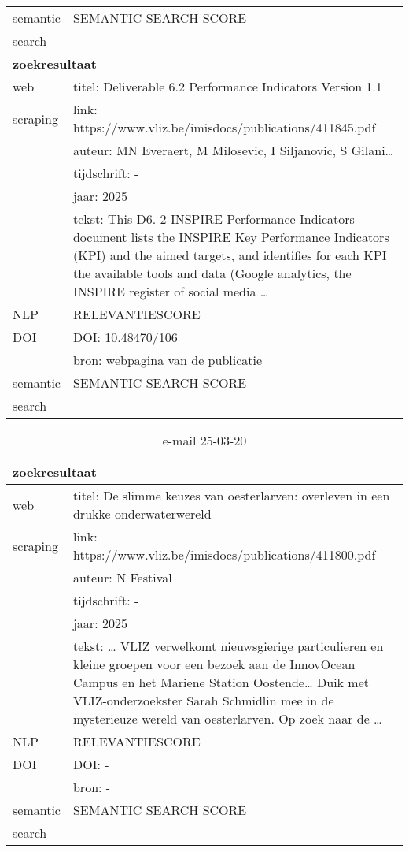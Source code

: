 \begin{table}[h!]
\begin{tabularx}{\textwidth}{|p{4cm}|X|}
        \hline
        semantic&SEMANTIC SEARCH SCORE\\
        search&\\
        \hline
        \multicolumn{2}{|X|}{\textbf{zoekresultaat}} \\
        \hline
        web &titel: Deliverable 6.2 Performance Indicators Version 1.1\\
        scraping&link: https://www.vliz.be/imisdocs/publications/411845.pdf\\
        &auteur: MN Everaert, M Milosevic, I Siljanovic, S Gilani…\\
        &tijdschrift: -\\
        &jaar: 2025\\
        &tekst: This D6. 2 INSPIRE Performance Indicators document lists the INSPIRE Key Performance Indicators (KPI) and the aimed targets, and identifies for each KPI the available tools and data (Google analytics, the INSPIRE register of social media …\\
        \hline
        NLP&RELEVANTIESCORE\\
        \hline
        DOI&DOI: 10.48470/106\\
        &bron: webpagina van de publicatie\\
        \hline
        semantic&SEMANTIC SEARCH SCORE\\
        search&\\
        \hline
    \end{tabularx}
    \label{table:email20250317}
\end{table}
\begin{table}[h!]
    \caption{e-mail 25-03-20}
    \centering
    \begin{tabularx}{\textwidth}{|p{4cm}|X|} 
        \hline
        \multicolumn{2}{|X|}{\textbf{zoekresultaat}} \\
        \hline
        web &titel: De slimme keuzes van oesterlarven: overleven in een drukke onderwaterwereld\\
        scraping&link: https://www.vliz.be/imisdocs/publications/411800.pdf\\
        &auteur: N Festival\\
        &tijdschrift: -\\
        &jaar: 2025\\
        &tekst: … VLIZ verwelkomt nieuwsgierige particulieren en kleine groepen voor een bezoek aan de InnovOcean Campus en het Mariene Station Oostende… Duik met VLIZ-onderzoekster Sarah Schmidlin mee in de mysterieuze wereld van oesterlarven. Op zoek naar de …\\
        \hline
        NLP&RELEVANTIESCORE\\
        \hline
        DOI&DOI: -\\
        &bron: -\\
        \hline
        semantic&SEMANTIC SEARCH SCORE\\
        search&\\
        \hline
    \end{tabularx}
    \label{table:email20250320}
\end{table}
